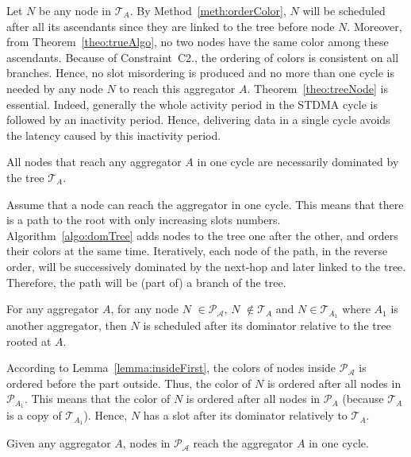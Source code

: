\proof
Let $N$ be any node in $\mathcal{T}_{A}$. By Method~\ref{meth:orderColor}, $N$  will be scheduled after all its ascendants since they are linked to the tree before node $N$. Moreover, from Theorem~\ref{theo:trueAlgo}, no two nodes have the same color among these ascendants. 
Because of Constraint~C2., the ordering of colors is consistent on all branches. Hence, no slot misordering is produced and no more than one cycle is needed by any node $N$ to reach this aggregator $A$. 
\endproof
Theorem~\ref{theo:treeNode} is essential. Indeed, generally the whole activity period in the STDMA cycle is followed by an inactivity period. Hence, delivering data in a single cycle avoids the latency caused by this inactivity period.

\begin{lemma}
All nodes that reach any aggregator $A$ in one cycle are necessarily dominated by the tree $\mathcal{T}_A$.
\end{lemma}

\proof
Assume that a node can reach the aggregator in one cycle. This means that there is a path to the root with only increasing slots numbers. Algorithm~\ref{algo:domTree} adds nodes to the tree one after the other, and orders their colors at the same time.
Iteratively, each node of the path, in the reverse order, will be successively dominated by the next-hop and later linked to the tree. Therefore, the path will be (part of) a branch of the tree. 
\endproof





\begin{lemma}\label{lemma:otherTree}
For any aggregator $A$, for any node $N$ $\in \mathcal{P_A}$, 
$N$ $\notin \mathcal{T}_A$ and $N \in \mathcal{T}_{A_1}$ where $A_1$ is another aggregator, then $N$ is scheduled after its dominator relative to the tree rooted at $A$.
\end{lemma}

\proof
According to Lemma~\ref{lemma:insideFirst}, the colors of nodes inside $\mathcal{P_A}$ is ordered before the part outside. Thus, the color of $N$ is ordered after all nodes in $\mathcal{P}_{A_1}$. This means that the color of $N$ is ordered after all nodes in $\mathcal{P}_A$ (because $\mathcal{T}_A$ is a copy of $\mathcal{T}_{A_1}$). Hence, $N$ has a slot after its dominator relatively to $\mathcal{T}_A$.


\endproof

\begin{theorem}\label{theo:oneCycleTree}
Given any aggregator $A$, nodes in $\mathcal{P_A}$ reach the aggregator $A$ in one cycle.
\end{theorem}

